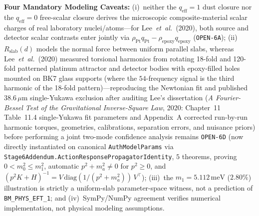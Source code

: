 \begin{enumerate}[leftmargin=2em]
\begin{itemize}
  \end{itemize}
  \textbf{Four Mandatory Modeling Caveats:} (i)~neither the $q_{\mathrm{eff}} = 1$ dust closure nor the $q_{\mathrm{eff}} = 0$ free-scalar closure derives the microscopic composite-material scalar charges of real laboratory nuclei/atoms---for Lee~\emph{et~al.}\ (2020), both source and detector scalar contrasts enter jointly via $\rho_{\mathrm{Pt}} q_{\mathrm{Pt}} - \rho_{\mathrm{epoxy}} q_{\mathrm{epoxy}}$ (\texttt{OPEN-6A}); (ii)~$R_{\mathrm{slab}}(d)$ models the normal force between uniform parallel slabs, whereas Lee~\emph{et~al.}\ (2020) measured torsional harmonics from rotating 18-fold and 120-fold patterned platinum attractor and detector bodies with epoxy-filled holes mounted on BK7 glass supports (where the $54$-frequency signal is the third harmonic of the 18-fold pattern)---reproducing the Newtonian fit and published $38.6\,\mu\mathrm{m}$ single-Yukawa exclusion after auditing Lee's dissertation (\emph{A Fourier-Bessel Test of the Gravitational Inverse-Square Law}, 2020: Chapter~11 Table~11.4 single-Yukawa fit parameters and Appendix~A corrected run-by-run harmonic torques, geometries, calibrations, separation errors, and nuisance priors) before performing a joint two-mode confidence analysis remains \texttt{OPEN-6D} (now directly instantiated on canonical \texttt{AuthModelParams} via \texttt{Stage6Addendum.\allowbreak{}ActionResponsePropagatorIdentity}, $5$ theorems, proving $0 < m_0^2 \le m_1^2$, automatic $p^2 + m_a^2 \ne 0$ for $p^2 \ge 0$, and $(p^2 K + H)^{-1} = V\,\mathrm{diag}(1/(p^2+m_a^2))\,V^\top$); (iii)~the $m_1 = 5.112\,\mathrm{meV}$ ($2.80\%$) illustration is strictly a uniform-slab parameter-space witness, not a prediction of \texttt{BM\_PHYS\_EFT\_1}; and (iv)~SymPy/NumPy agreement verifies numerical implementation, not physical modeling assumptions.

\end{enumerate}
